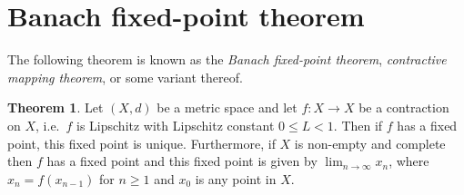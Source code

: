 \documentclass[12pt]{article}
\theoremstyle{definition}
\newtheorem{theorem}{Theorem}
\begin{document}
\section{Banach fixed-point theorem}

The following theorem is known as the \textit{Banach fixed-point theorem}, \textit{contractive mapping theorem}, or some variant thereof.

\begin{theorem}

Let \( (X, d) \) be a metric space and let \( f : X \to X \) be a contraction on \( X \), i.e.\ \( f \) is Lipschitz with Lipschitz constant \( 0 \leq L < 1 \). Then if \( f \) has a fixed point, this fixed point is unique. Furthermore, if \( X \) is non-empty and complete then \( f \) has a fixed point and this fixed point is given by \( \lim_{n\to\infty} x_n \), where \( x_n = f(x_{n-1}) \) for \( n \geq 1 \) and \( x_0 \) is any point in \( X \).

\end{theorem}
\end{document}
